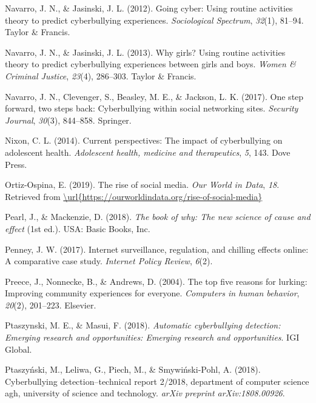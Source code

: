 \documentclass[10pt,dvipsnames]{scrartcl}
\begin{document}
\hypertarget{ref-navarro2012going}{}
Navarro, J. N., \& Jasinski, J. L. (2012). Going cyber: Using routine
activities theory to predict cyberbullying experiences.
\emph{Sociological Spectrum}, \emph{32}(1), 81--94. Taylor \& Francis.

\hypertarget{ref-navarro2013girls}{}
Navarro, J. N., \& Jasinski, J. L. (2013). Why girls? Using routine
activities theory to predict cyberbullying experiences between girls and
boys. \emph{Women \& Criminal Justice}, \emph{23}(4), 286--303. Taylor
\& Francis.

\hypertarget{ref-navarro2017one}{}
Navarro, J. N., Clevenger, S., Beasley, M. E., \& Jackson, L. K. (2017).
One step forward, two steps back: Cyberbullying within social networking
sites. \emph{Security Journal}, \emph{30}(3), 844--858. Springer.

\hypertarget{ref-nixon2014current}{}
Nixon, C. L. (2014). Current perspectives: The impact of cyberbullying
on adolescent health. \emph{Adolescent health, medicine and
therapeutics}, \emph{5}, 143. Dove Press.

\hypertarget{ref-ortiz2019rise}{}
Ortiz-Ospina, E. (2019). The rise of social media. \emph{Our World in
Data}, \emph{18}. Retrieved from
\href{/url\%7Bhttps://ourworldindata.org/rise-of-social-media\%7D}{\textbackslash{}url\{https://ourworldindata.org/rise-of-social-media\}}

\hypertarget{ref-pearl2018why}{}
Pearl, J., \& Mackenzie, D. (2018). \emph{The book of why: The new
science of cause and effect} (1st ed.). USA: Basic Books, Inc.

\hypertarget{ref-penney2017internet}{}
Penney, J. W. (2017). Internet surveillance, regulation, and chilling
effects online: A comparative case study. \emph{Internet Policy Review},
\emph{6}(2).

\hypertarget{ref-preece2004top}{}
Preece, J., Nonnecke, B., \& Andrews, D. (2004). The top five reasons
for lurking: Improving community experiences for everyone.
\emph{Computers in human behavior}, \emph{20}(2), 201--223. Elsevier.

\hypertarget{ref-ptaszynski2018automatic}{}
Ptaszynski, M. E., \& Masui, F. (2018). \emph{Automatic cyberbullying
detection: Emerging research and opportunities: Emerging research and
opportunities}. IGI Global.

\hypertarget{ref-ptaszynski2018cyberbullying}{}
Ptaszyński, M., Leliwa, G., Piech, M., \& Smywiński-Pohl, A. (2018).
Cyberbullying detection--technical report 2/2018, department of computer
science agh, university of science and technology. \emph{arXiv preprint
arXiv:1808.00926}.
\end{document}
